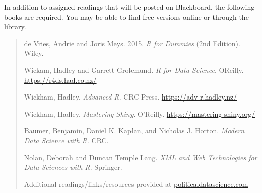 \documentclass[11pt]{article}
\begin{document}
In addition to assigned readings that will be posted on Blackboard,
the following books are required.  You may be able to find free
versions online or through the library. \singlespacing

\begin{quote}
\noindent de Vries, Andrie and Joris Meys. 2015.  \textit{R for
  Dummies} (2nd Edition). Wiley. 
\vspace{.2cm}

\noindent Wickam, Hadley and Garrett Grolemund. \textit{R for Data Science}. OReilly.  
\url{https://r4ds.had.co.nz/}

\vspace{.2cm}

\noindent Wickham, Hadley.  \textit{Advanced R}. CRC Press. \url{https://adv-r.hadley.nz/}
\vspace{.2cm}

\noindent Wickham, Hadley.  \textit{Mastering Shiny}. O'Reilly. \url{https://mastering-shiny.org/}
\vspace{.2cm}

\noindent Baumer, Benjamin, Daniel K. Kaplan, and Nicholas J. Horton. \textit{Modern Data Science with R}. CRC. 

\noindent Nolan, Deborah and Duncan Temple Lang.  \textit{XML and Web Technologies for Data Sciences with R}.  Springer.


Additional readings/links/resources provided at \url{politicaldatascience.com}
\vspace{.2cm}





\end{quote}









\end{document}
